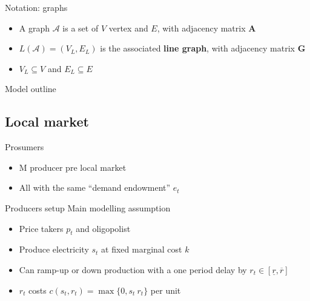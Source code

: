 \documentclass{beamer}
\newcommand{\matr}[1]{\bm{#1}}
\begin{document}
\begin{frame}{Notation: graphs}
    \begin{itemize} \setlength\itemsep{1.5em}
        \item A graph $\mathcal{A}$ is a set of $V$ vertex and $E$, with adjacency matrix $\matr{A}$ \pause
        \item $L(\mathcal{A}) = (V_L, E_L)$ is the associated \textbf{line graph}, with adjacency matrix $\matr{G}$ \pause
        \item $V_L \subseteq V$ and $E_L \subseteq E$ \pause
    \end{itemize}
    \begin{center}
        \resizebox{!}{0.4\textheight}{}
    \end{center}
\end{frame}


\begin{frame}{Model outline}
    \centering
    \only<1>{
        \resizebox{\textwidth}{!}{}}
\end{frame}

\subsection{Local market}

\begin{frame}{Prosumers}
    \begin{itemize} \setlength\itemsep{1.5em}
        \item M producer pre local market \pause
        \item All with the same ``demand endowment'' $e_t$
    \end{itemize}
\end{frame}

\begin{frame}{Producers setup}
    Main modelling assumption \vspace{5mm}
    \begin{itemize} \setlength\itemsep{1.5em}
        \item Price takers $p_t$ and oligopolist \pause
        \item Produce electricity $s_t$ at fixed marginal cost $k$ \pause
        \item Can ramp-up or down production with a one period delay by $r_t \in [\underline{r}, \overline{r}]$ \pause
        \item $r_t$ costs $c(s_t, r_t) = \max \{0, s_t \ r_t \}$ per unit
    \end{itemize}
\end{frame}
\end{document}
